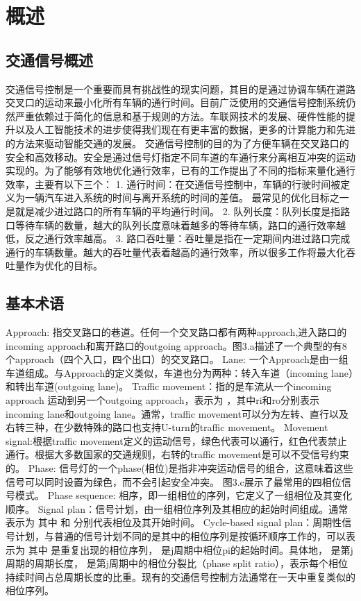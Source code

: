 
\chapter{概述}
\section{交通信号概述}
交通信号控制是一个重要而具有挑战性的现实问题，其目的是通过协调车辆在道路交叉口的运动来最小化所有车辆的通行时间。目前广泛使用的交通信号控制系统仍然严重依赖过于简化的信息和基于规则的方法。车联网技术的发展、硬件性能的提升以及人工智能技术的进步使得我们现在有更丰富的数据，更多的计算能力和先进的方法来驱动智能交通的发展。 
交通信号控制的目的为了方便车辆在交叉路口的安全和高效移动。安全是通过信号灯指定不同车道的车通行来分离相互冲突的运动实现的。为了能够有效地优化通行效率，已有的工作提出了不同的指标来量化通行效率，主要有以下三个：
1.	通行时间：在交通信号控制中，车辆的行驶时间被定义为一辆汽车进入系统的时间与离开系统的时间的差值。 最常见的优化目标之一是就是减少进过路口的所有车辆的平均通行时间。
2.	队列长度：队列长度是指路口等待车辆的数量，越大的队列长度意味着越多的等待车辆，路口的通行效率越低，反之通行效率越高。
3.	路口吞吐量：吞吐量是指在一定期间内进过路口完成通行的车辆数量。越大的吞吐量代表着越高的通行效率，所以很多工作将最大化吞吐量作为优化的目标。
\section{基本术语}
Approach: 指交叉路口的巷道。任何一个交叉路口都有两种approach,进入路口的incoming approach和离开路口的outgoing approach。图3.a描述了一个典型的有8个approach（四个入口，四个出口）的交叉路口。
Lane: 一个Approach是由一组车道组成。与Approach的定义类似，车道也分为两种：转入车道（incoming lane）和转出车道(outgoing lane)。
Traffic movement：指的是车流从一个incoming approach 运动到另一个outgoing approach，表示为 ，其中ri和ro分别表示incoming lane和outgoing lane。通常，traffic movement可以分为左转、直行以及右转三种，在少数特殊的路口也支持U-turn的traffic movement。
Movement signal:根据traffic movement定义的运动信号，绿色代表可以通行，红色代表禁止通行。根据大多数国家的交通规则，右转的traffic movement是可以不受信号约束的。
Phase: 信号灯的一个phase(相位)是指非冲突运动信号的组合，这意味着这些信号可以同时设置为绿色，而不会引起安全冲突。 图3.c展示了最常用的四相位信号模式。
Phase sequence: 相序，即一组相位的序列，它定义了一组相位及其变化顺序。
Signal plan：信号计划，由一组相位序列及其相应的起始时间组成。通常表示为 其中 和 分别代表相位及其开始时间。
Cycle-based signal plan：周期性信号计划，与普通的信号计划不同的是其中的相位序列是按循环顺序工作的，可以表示为 其中 是重复出现的相位序列， 是j周期中相位pi的起始时间。具体地， 是第j周期的周期长度， 是第j周期中的相位分裂比（phase split ratio），表示每个相位持续时间占总周期长度的比重。现有的交通信号控制方法通常在一天中重复类似的相位序列。

